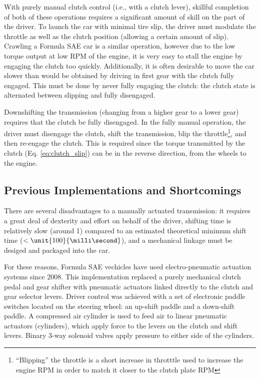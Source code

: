 With purely manual clutch control (i.e., with a clutch lever), skillful completion of both of these operations requires a significant amount of skill on the part of the driver. To launch the car with minimal tire slip, the driver must modulate the throttle as well as the clutch position (allowing a certain amount of slip). Crawling a Formula SAE car is a similar operation, however due to the low torque output at low RPM of the engine, it is very easy to stall the engine by engaging the clutch too quickly. Additionally, it is often desirable to move the car slower than would be obtained by driving in first gear with the clutch fully engaged. This must be done by never fully engaging the clutch: the clutch state is alternated between slipping and fully disengaged.

Downshifting the transmission (changing from a higher gear to a lower gear) requires that the clutch be fully disengaged. In the fully manual operation, the driver must disengage the clutch, shift the transmission, blip the throttle\footnote{``Blipping'' the throttle is a short increase in throtttle used to increase the engine RPM in order to match it closer to the clutch plate RPM}, and then re-engage the clutch. This is required since the torque transmitted by the clutch (Eq. \ref{eq:clutch_slip}) can be in the reverse direction, from the wheels to the engine.


\subsection{Previous Implementations and Shortcomings}

There are several disadvantages to a manually actuated transmission: it requires a great deal of dexterity and effort on behalf of the driver, shifting time is relatively slow (around \unit{1}{\second}) compared to an estimated theoretical minimum shift time ($<\unit{100}{\milli\second}$), and a mechanical linkage must be desiged and packaged into the car.

For these reasons, Formula SAE vechicles have used electro-pneumatic actuation systems since 2008. This implementation replaced a purely mechanical clutch pedal and gear shifter with pneumatic actuators linked directly to the clutch and gear selector levers. Driver control was achieved with a set of electronic paddle switches located on the steering wheel: an up-shift paddle and a down-shift paddle. A compressed air cylinder is used to feed air to linear pneumatic actuators (cylinders), which apply force to the levers on the clutch and shift levers. Binary 3-way solenoid valves apply pressure to either side of the cylinders.

